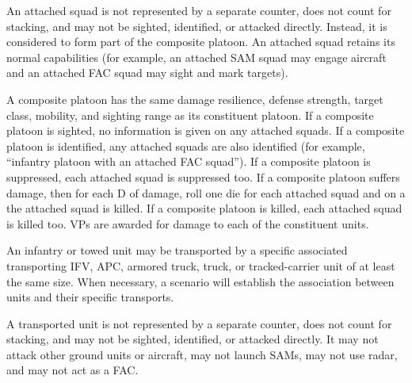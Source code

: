 An attached squad is not represented by a separate counter, does not count for stacking, and may not be sighted, identified, or attacked directly.
Instead, it is considered to form part of the composite platoon.
An attached squad retains its normal capabilities (for example, an attached SAM squad may engage aircraft and an attached FAC squad may sight and mark targets).


A composite platoon has the same damage resilience, defense strength, target class, mobility, and sighting range as its constituent platoon.
If a composite platoon is sighted, no information is given on any attached squads.
If a composite platoon is identified, any attached squads are also identified (for example, “infantry platoon with an attached FAC squad”).
If a composite platoon is suppressed, each attached squad is suppressed too.
If a composite platoon suffers damage, then for each D of damage, roll one die for each attached squad and on a  the attached squad is killed.
If a composite platoon is killed, each attached squad is killed too.
VPs are awarded for damage to each of the constituent units.%



An infantry or towed unit may be transported by a specific associated transporting IFV, APC, armored truck, truck, or tracked-carrier unit of at least the same size.
When necessary, a scenario will establish the association between units and their specific transports.
%

A transported unit is not represented by a separate counter, does not count for stacking, and may not be sighted, identified, or attacked directly. It may not attack other ground units or aircraft, may not launch SAMs, may not use radar, and may not act as a FAC.

